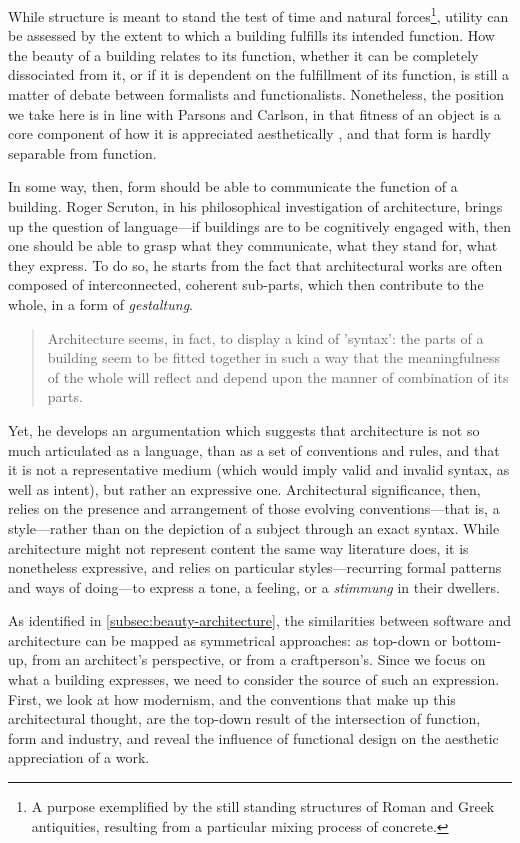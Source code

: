 While structure is meant to stand the test of time and natural forces\footnote{A purpose exemplified by the still standing structures of Roman and Greek antiquities, resulting from a particular mixing process of concrete.}, utility can be assessed by the extent to which a building fulfills its intended function. How the beauty of a building relates to its function, whether it can be completely dissociated from it, or if it is dependent on the fulfillment of its function, is still a matter of debate between formalists and functionalists. Nonetheless, the position we take here is in line with Parsons and Carlson, in that fitness of an object is a core component of how it is appreciated aesthetically \citep{parsons_functional_2012}, and that form is hardly separable from function.

In some way, then, form should be able to communicate the function of a building. Roger Scruton, in his philosophical investigation of architecture, brings up the question of language—if buildings are to be cognitively engaged with, then one should be able to grasp what they communicate, what they stand for, what they express. To do so, he starts from the fact that architectural works are often composed of interconnected, coherent sub-parts, which then contribute to the whole, in a form of \emph{gestaltung}.

\begin{quote}
    Architecture seems, in fact, to display a kind of 'syntax': the parts of a building seem to be fitted together in such a way that the meaningfulness of the whole will reflect and depend upon the manner of combination of its parts. \citep{scruton_aesthetics_2013}
\end{quote}

Yet, he develops an argumentation which suggests that architecture is not so much articulated as a language, than as a set of conventions and rules, and that it is not a representative medium (which would imply valid and invalid syntax, as well as intent), but rather an expressive one. Architectural significance, then, relies on the presence and arrangement of those evolving conventions—that is, a style—rather than on the depiction of a subject through an exact syntax. While architecture might not represent content the same way literature does, it is nonetheless expressive, and relies on particular styles—recurring formal patterns and ways of doing—to express a tone, a feeling, or a \emph{stimmung} in their dwellers.

As identified in \ref{subsec:beauty-architecture}, the similarities between software and architecture can be mapped as symmetrical approaches: as top-down or bottom-up, from an architect's perspective, or from a craftperson's. Since we focus on what a building expresses, we need to consider the source of such an expression. First, we look at how modernism, and the conventions that make up this architectural thought, are the top-down result of the intersection of function, form and industry, and reveal the influence of functional design on the aesthetic appreciation of a work.

